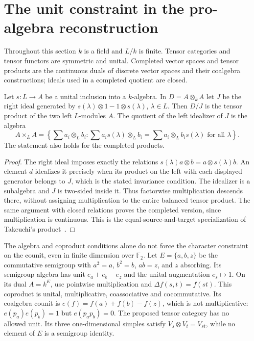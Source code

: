 \section{The unit constraint in the pro-algebra reconstruction}

Throughout this section $k$ is a field and $L/k$ is finite. Tensor
categories and tensor functors are symmetric and unital. Completed
vector spaces and tensor products are the continuous duals of
discrete vector spaces and their coalgebra constructions; ideals
used in a completed quotient are closed.

\begin{lemma}\label{lem:idealizer-takeuchi}
Let $s:L\to A$ be a unital inclusion into a $k$-algebra. In
$D=A\otimes_kA$ let $J$ be the right ideal generated by
$s(\lambda)\otimes1-1\otimes s(\lambda)$, $\lambda\in L$.
Then $D/J$ is the tensor product of the two left $L$-modules $A$.
The quotient of the left idealizer of $J$ is the algebra
\[
 A\times_LA=\left\{\sum a_i\otimes_Lb_i:
 \sum a_is(\lambda)\otimes_Lb_i
 =\sum a_i\otimes_Lb_is(\lambda)\text{ for all }\lambda\right\}.
\]
The statement also holds for the completed products.
\end{lemma}
\begin{proof}
The right ideal imposes exactly the relations
$s(\lambda)a\otimes b=a\otimes s(\lambda)b$. An element $d$
idealizes it precisely when its product on the left with each
displayed generator belongs to $J$, which is the stated invariance
condition. The idealizer is a subalgebra and $J$ is two-sided
inside it. Thus factorwise multiplication descends there, without
assigning multiplication to the entire balanced tensor product.
The same argument with closed relations proves the completed
version, since multiplication is continuous.
This is the equal-source-and-target specialization of Takeuchi's
product~\cite[Section~1, Proposition~3.1 and Definition~4.5]{Takeuchi1977}.
\end{proof}

\begin{example}\label{ex:missing-unit-character}
The algebra and coproduct conditions alone do not force the
character constraint on the counit, even in finite dimension over
$\mathbb F_2$. Let $E=\{a,b,z\}$ be the commutative semigroup
with $a^2=a$, $b^2=b$, $ab=z$, and $z$ absorbing. Its semigroup
algebra has unit $e_a+e_b-e_z$ and the unital augmentation
$e_s\mapsto1$. On its dual $A=k^E$, use pointwise multiplication
and $\Delta f(s,t)=f(st)$. This coproduct is unital,
multiplicative, coassociative and cocommutative. Its coalgebra
counit is $e(f)=f(a)+f(b)-f(z)$, which is not multiplicative:
$e(p_a)e(p_b)=1$ but $e(p_ap_b)=0$.
The proposed tensor category has no allowed unit. Its three
one-dimensional simples satisfy $V_s\otimes V_t=V_{st}$, while
no element of $E$ is a semigroup identity.
\end{example}

